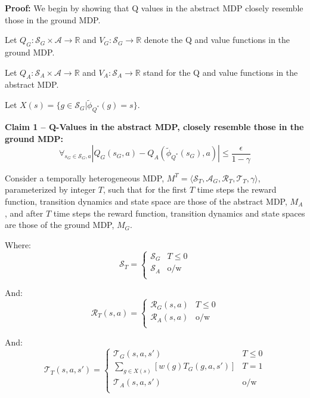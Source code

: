 \documentclass{article}
\newcommand{\ep}{\widetilde \phi}
\newcommand{\epQ}{\ep_{Q^*}}
\begin{document}
\textbf{Proof:}
We begin by showing that Q values in the abstract \ac{MDP} closely resemble those in the ground \ac{MDP}.

Let $Q_G : \mathcal{S}_G \times \mathcal{A} \rightarrow \mathbb{R}$ and $V_G : \mathcal{S}_G \rightarrow \mathbb{R}$ denote the Q and value functions in the ground \ac{MDP}.

Let $Q_A  : \mathcal{S}_A \times \mathcal{A} \rightarrow \mathbb{R}$ and $V_A : \mathcal{S}_A \rightarrow \mathbb{R}$  stand for the Q and value functions in the abstract \ac{MDP}.

Let $X(s) = \{g \in \mathcal{S}_G | \epQ(g) = s\}$.

\textbf{Claim 1 -- Q-Values in the abstract MDP, closely resemble those in the ground MDP:}
\begin{equation}
\label{eq:Q*Claim1}
\forall_{s_G \in \mathcal{S}_G, a} |Q_G(s_G, a) - Q_A(\epQ(s_G), a)| \leq \frac{\epsilon}{1-\gamma}
\end{equation}

Consider a temporally heterogeneous \ac{MDP}, $M^T = \langle \mathcal{S}_T, \mathcal{A}_G, \mathcal{R}_T, \mathcal{T}_T, \gamma \rangle$, parameterized by integer $T$, such that for the first $T$ time steps the reward function, transition dynamics and state space are those of the abstract MDP, $M_A$, and after $T$ time steps the reward function, transition dynamics and state spaces are those of the ground MDP, $M_G$. 

Where:
\begin{equation}
\mathcal{S}_T = \begin{cases}
\mathcal{S}_G& T \leq 0 \\
\mathcal{S}_A& \text{o/w} \\
\end{cases}
\end{equation}

And:
\begin{equation}
\mathcal{R}_T(s,a) = \begin{cases}
\mathcal{R}_G(s,a)& T \leq 0 \\
\mathcal{R}_A(s, a)& \text{o/w} \\
\end{cases}
\end{equation}

And:
\begin{equation}
\mathcal{T}_T(s,a,s') = \begin{cases}
\mathcal{T}_G(s,a,s')& T \leq 0 \\
\underset{{g \in X(s)}}{\sum}\left[w(g)T_G(g, a, s')\right]& T = 1 \\
\mathcal{T}_A(s,a,s')& \text{o/w} \\
\end{cases}
\end{equation}
\end{document}
